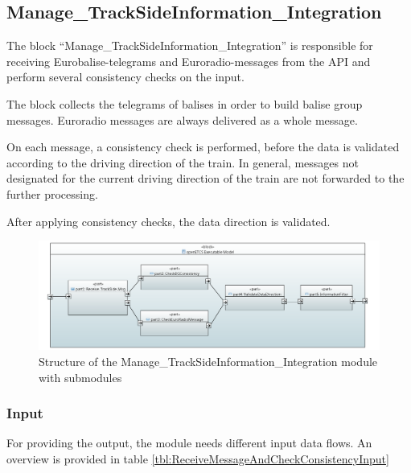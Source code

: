 \subsection{Manage\_TrackSideInformation\_Integration}

The block ``Manage\_TrackSideInformation\_Integration'' is responsible for receiving Eurobalise-telegrams and Euroradio-messages from the API and perform several consistency checks on the input.

The block collects the telegrams of balises in order to build balise group messages. Euroradio messages are always delivered as a whole message. 

On each message, a consistency check is performed, before the data is validated according to the driving direction of the train. In general, messages not designated for the current driving direction of the train are not forwarded to the further processing.

After applying consistency checks, the data direction is validated.


\begin{figure}[H]
 \centering
 \includegraphics[width=\textwidth]{./images/Input-Messages4.PNG}
 \caption{Structure of the Manage\_TrackSideInformation\_Integration module with submodules}
 \label{fig:receiveAndCheckConsistencyArch}
\end{figure}


\subsubsection{Input}
For providing the output, the module needs different input data flows. An overview is provided in table \ref{tbl:ReceiveMessageAndCheckConsistencyInput}

